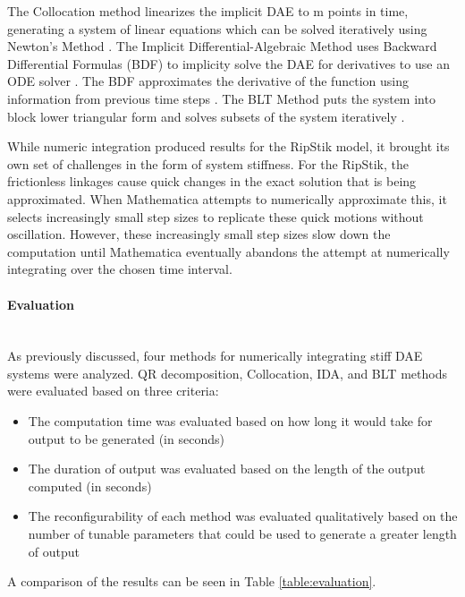 The Collocation method linearizes the implicit DAE to m points in time, generating a system of linear equations which can be solved iteratively using Newton's Method \cite{Methods}.
The Implicit Differential-Algebraic Method uses Backward Differential Formulas (BDF) to implicity solve the DAE for derivatives to use an ODE solver \cite{Methods}. 
The BDF approximates the derivative of the function using information from previous time steps \cite{Methods}.
The BLT Method puts the system into block lower triangular form and solves subsets of the system iteratively \cite{Methods}.

While numeric integration produced results for the RipStik model, it brought its own set of challenges in the form of system stiffness.
For the RipStik, the frictionless linkages cause quick changes in the exact solution that is being approximated. 
When Mathematica attempts to numerically approximate this, it selects increasingly small step sizes to replicate these quick motions without oscillation. 
However, these increasingly small step sizes slow down the computation until Mathematica eventually abandons the attempt at numerically integrating over the chosen time interval.

\paragraph{Evaluation}\mbox{}\\
As previously discussed, four methods for numerically integrating stiff DAE systems were analyzed. 
QR decomposition, Collocation, IDA, and BLT methods were evaluated based on three criteria:
\begin{itemize}
\item The computation time was evaluated based on how long it would take for output to be generated (in seconds)
\item The duration of output was evaluated based on the length of the output computed (in seconds)
\item The reconfigurability of each method was evaluated qualitatively based on the number of tunable parameters that could be used to generate a greater length of output
\end{itemize}
A comparison of the results can be seen in Table \ref{table:evaluation}.

